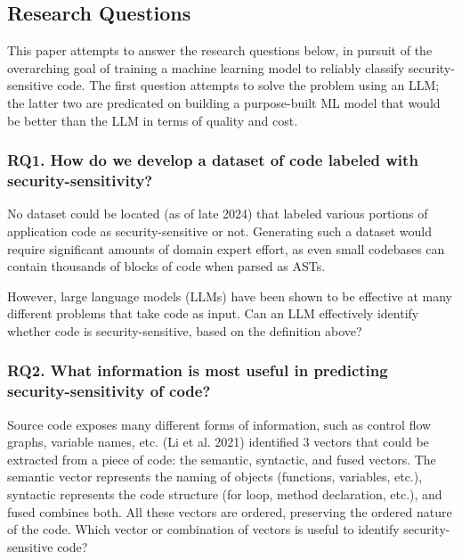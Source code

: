 \documentclass[11pt]{article}
\begin{document}
\subsection{Research Questions}\label{research-questions}

This paper attempts to answer the research questions below, in
pursuit of the overarching goal of training a machine learning model to
reliably classify security-sensitive code. The first question attempts
to solve the problem using an LLM; the latter two are predicated on
building a purpose-built ML model that would be better than the LLM in
terms of quality and cost.

\subsubsection*{RQ1. How do we develop a dataset of code labeled with security-sensitivity?}\label{rq1.-how-do-we-develop-a-dataset-of-code-labeled-with-security-sensitivity}

No dataset could be located (as of late 2024) that labeled various
portions of application code as security-sensitive or not. Generating
such a dataset would require significant amounts of domain expert
effort, as even small codebases can contain thousands of blocks of code
when parsed as ASTs.

However, large language models (LLMs) have been shown to be effective at
many different problems that take code as input. Can an LLM effectively
identify whether code is security-sensitive, based on the definition
above?

\subsubsection*{RQ2. What information is most useful in predicting security-sensitivity of code?}\label{rq2.-what-information-is-most-useful-in-predicting-security-sensitivity-of-code}

Source code exposes many different forms of information, such as control
flow graphs, variable names, etc. (Li et al. 2021) identified 3 vectors
that could be extracted from a piece of code: the semantic, syntactic,
and fused vectors. The semantic vector represents the naming of objects
(functions, variables, etc.), syntactic represents the code structure
(for loop, method declaration, etc.), and fused combines both. All these
vectors are ordered, preserving the ordered nature of the code. Which
vector or combination of vectors is useful to identify
security-sensitive code?
\end{document}
